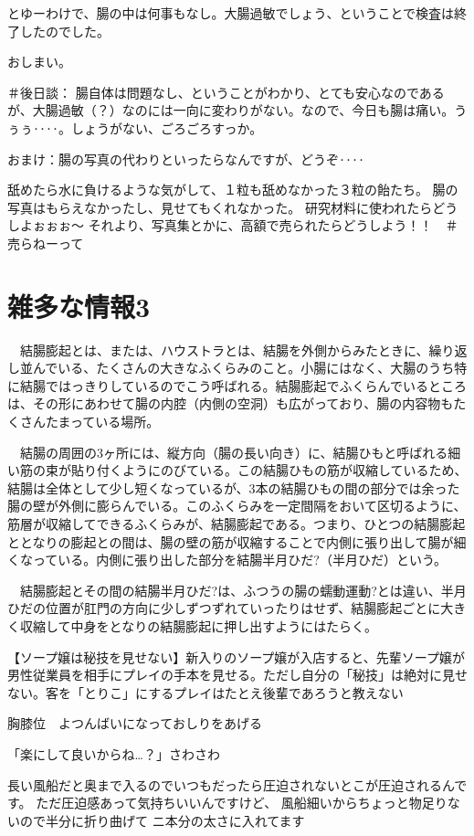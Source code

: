 とゆーわけで、腸の中は何事もなし。大腸過敏でしょう、ということで検査は終了したのでした。

おしまい。

＃後日談：
腸自体は問題なし、ということがわかり、とても安心なのであるが、大腸過敏（？）なのには一向に変わりがない。なので、今日も腸は痛い。うぅぅ‥‥。しょうがない、ごろごろすっか。

おまけ：腸の写真の代わりといったらなんですが、どうぞ‥‥

舐めたら水に負けるような気がして、１粒も舐めなかった３粒の飴たち。
腸の写真はもらえなかったし、見せてもくれなかった。
研究材料に使われたらどうしよぉぉぉ～
それより、写真集とかに、高額で売られたらどうしよう！！　＃売らねーって



\section{雑多な情報3}
　結腸膨起とは、または、ハウストラとは、結腸を外側からみたときに、繰り返し並んでいる、たくさんの大きなふくらみのこと。小腸にはなく、大腸のうち特に結腸ではっきりしているのでこう呼ばれる。結腸膨起でふくらんでいるところは、その形にあわせて腸の内腔（内側の空洞）も広がっており、腸の内容物もたくさんたまっている場所。

　結腸の周囲の3ヶ所には、縦方向（腸の長い向き）に、結腸ひもと呼ばれる細い筋の束が貼り付くようにのびている。この結腸ひもの筋が収縮しているため、結腸は全体として少し短くなっているが、3本の結腸ひもの間の部分では余った腸の壁が外側に膨らんでいる。このふくらみを一定間隔をおいて区切るように、筋層が収縮してできるふくらみが、結腸膨起である。つまり、ひとつの結腸膨起ととなりの膨起との間は、腸の壁の筋が収縮することで内側に張り出して腸が細くなっている。内側に張り出した部分を結腸半月ひだ?（半月ひだ）という。

　結腸膨起とその間の結腸半月ひだ?は、ふつうの腸の蠕動運動?とは違い、半月ひだの位置が肛門の方向に少しずつずれていったりはせず、結腸膨起ごとに大きく収縮して中身をとなりの結腸膨起に押し出すようにはたらく。

【ソープ嬢は秘技を見せない】新入りのソープ嬢が入店すると、先輩ソープ嬢が男性従業員を相手にプレイの手本を見せる。ただし自分の「秘技」は絶対に見せない。客を「とりこ」にするプレイはたとえ後輩であろうと教えない

胸膝位　よつんばいになっておしりをあげる

「楽にして良いからね…？」さわさわ

長い風船だと奥まで入るのでいつもだったら圧迫されないとこが圧迫されるんです。
ただ圧迫感あって気持ちいいんですけど、
風船細いからちょっと物足りないので半分に折り曲げて
ニ本分の太さに入れてます


